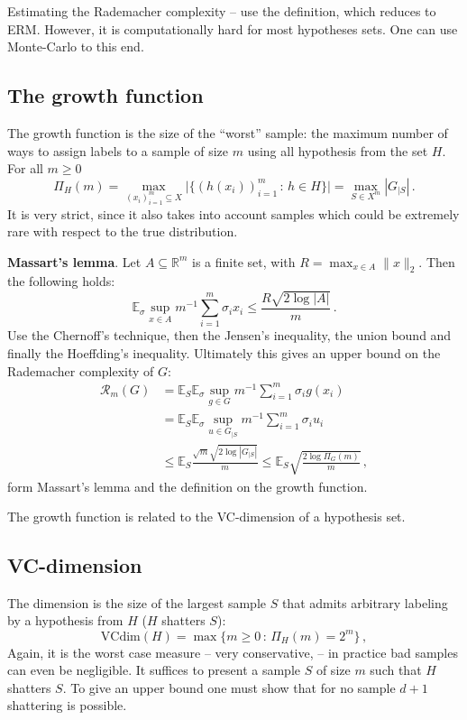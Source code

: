 \documentclass[a4paper]{article}
\newcommand{\Real}{\mathbb{R}}
\newcommand{\ex}{\mathbb{E}}
\begin{document}
Estimating the Rademacher complexity -- use the definition, which reduces to ERM.
However, it is computationally hard for most hypotheses sets. One can use Monte-Carlo
to this end.


\subsection{The growth function} %
\label{sub:the_growth_function}

The growth function is the size of the ``worst'' sample: the maximum number of ways
to assign labels to a sample of size $m$ using all hypothesis from the set $H$.
For all $m\geq 0$
\[ \Pi_H(m)
    = \max_{(x_i)_{i=1}^m \subseteq X}
        \bigl| \{ (h(x_i))_{i=1}^m\,:\,h\in H \} \bigr|
    = \max_{S \in X^m} |G_{|S}|
    \,. \]
It is very strict, since it also takes into account samples which could be extremely
rare with respect to the true distribution.

\textbf{Massart's lemma}. Let $A\subseteq \Real^m$ is a finite set, with
$R = \max_{x\in A} \|x\|_2$. Then the following holds:
\[ \ex_\sigma \sup_{x\in A} m^{-1} \sum_{i=1}^m \sigma_i x_i
    \leq \frac{R\sqrt{2\log|A|}}{m} \,. \]
Use the Chernoff's technique, then the Jensen's inequality, the union bound and finally
the Hoeffding's inequality. Ultimately this gives an upper bound on the Rademacher
complexity of $G$:
\begin{align*}
    \mathcal{R}_m(G)
    &= \ex_S \ex_\sigma \sup_{g\in G} m^{-1} \sum_{i=1}^m\sigma_i g(x_i) \\
    &= \ex_S \ex_\sigma \sup_{u\in G_{|S}} m^{-1} \sum_{i=1}^m\sigma_i u_i \\
    &\leq \ex_S \frac{\sqrt{m} \sqrt{2 \log|G_{|S}|}}{m}
    \leq \ex_S \sqrt{\frac{2 \log \Pi_G(m)}{m}} \,,
\end{align*}
form Massart's lemma and the definition on the growth function.

The growth function is related to the VC-dimension of a hypothesis set.


\subsection{VC-dimension} %
\label{sub:vc_dimension}

The dimension is the size of the largest sample $S$ that admits arbitrary labeling
by a hypothesis from $H$ ($H$ shatters $S$):
\[ \text{VCdim}(H) = \max\{m \geq 0 \, : \, \Pi_H(m) = 2^m \} \,, \]
Again, it is the worst case measure -- very conservative, -- in practice bad samples
can even be negligible. It suffices to present a sample $S$ of size $m$ such that
$H$ shatters $S$. To give an upper bound one must show that for no sample $d+1$
shattering is possible.
\end{document}
